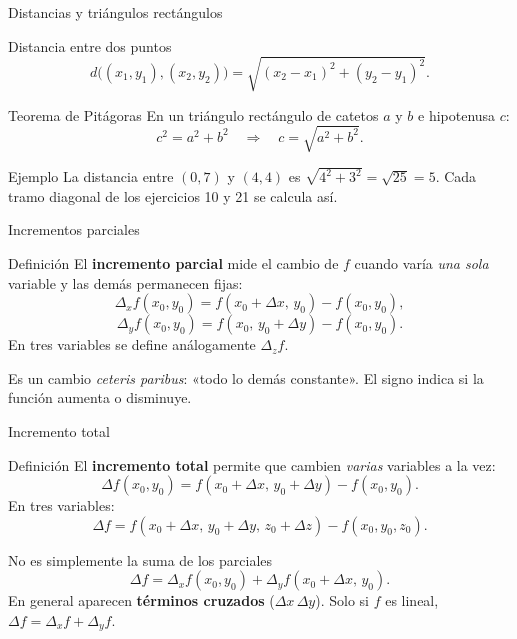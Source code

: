 \documentclass[aspectratio=169]{beamer}
\begin{document}
\begin{frame}{Distancias y triángulos rectángulos}
  \begin{block}{Distancia entre dos puntos}
    \[
      d\bigl((x_1,y_1),(x_2,y_2)\bigr)
      =\sqrt{(x_2-x_1)^{2}+(y_2-y_1)^{2}}.
    \]
  \end{block}
  \begin{block}{Teorema de Pitágoras}
    En un triángulo rectángulo de catetos \(a\) y \(b\) e hipotenusa \(c\):
    \[
      c^{2}=a^{2}+b^{2}
      \quad\Longrightarrow\quad
      c=\sqrt{a^{2}+b^{2}}.
    \]
  \end{block}
  \begin{exampleblock}{Ejemplo}
    La distancia entre \((0,7)\) y \((4,4)\) es
    \(\sqrt{4^{2}+3^{2}}=\sqrt{25}=5\). Cada tramo diagonal de los ejercicios
    10 y 21 se calcula así.
  \end{exampleblock}
\end{frame}

\begin{frame}{Incrementos parciales}
  \begin{block}{Definición}
    El \textbf{incremento parcial} mide el cambio de \(f\) cuando varía
    \emph{una sola} variable y las demás permanecen fijas:
    \[
      \Delta_x f(x_0,y_0)=f(x_0+\Delta x,\,y_0)-f(x_0,y_0),
    \]
    \[
      \Delta_y f(x_0,y_0)=f(x_0,\,y_0+\Delta y)-f(x_0,y_0).
    \]
    En tres variables se define análogamente \(\Delta_z f\).
  \end{block}
  \begin{mwextra}[Interpretación]
    Es un cambio \emph{ceteris paribus}: «todo lo demás constante». El signo
    indica si la función aumenta o disminuye.
  \end{mwextra}
\end{frame}

\begin{frame}{Incremento total}
  \begin{block}{Definición}
    El \textbf{incremento total} permite que cambien \emph{varias} variables
    a la vez:
    \[
      \Delta f(x_0,y_0)=f(x_0+\Delta x,\,y_0+\Delta y)-f(x_0,y_0).
    \]
    En tres variables:
    \[
      \Delta f=f(x_0+\Delta x,\,y_0+\Delta y,\,z_0+\Delta z)
             -f(x_0,y_0,z_0).
    \]
  \end{block}
  \begin{alertblock}{No es simplemente la suma de los parciales}
    \[
      \Delta f=\Delta_x f(x_0,y_0)+\Delta_y f(x_0+\Delta x,\,y_0).
    \]
    En general aparecen \textbf{términos cruzados} (\(\Delta x\,\Delta y\)).
    Solo si \(f\) es lineal, \(\Delta f=\Delta_x f+\Delta_y f\).
  \end{alertblock}
\end{frame}
\end{document}
